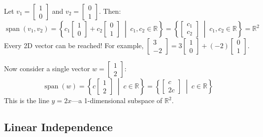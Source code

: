 \documentclass[11pt]{article}
\theoremstyle{definition}
\theoremstyle{plain}
\theoremstyle{remark}
\DeclareMathOperator{\spn}{span}
\begin{document}
\begin{workedexample}[title=\textbf{Worked Example: Computing a span}]
Let $v_1 = \begin{bmatrix}1\\0\end{bmatrix}$ and $v_2 = \begin{bmatrix}0\\1\end{bmatrix}$. Then:
\[
\spn(v_1, v_2) = \left\{c_1 \begin{bmatrix}1\\0\end{bmatrix} + c_2 \begin{bmatrix}0\\1\end{bmatrix} \;\middle|\; c_1, c_2 \in \mathbb{R}\right\} = \left\{\begin{bmatrix}c_1\\c_2\end{bmatrix} \;\middle|\; c_1, c_2 \in \mathbb{R}\right\} = \mathbb{R}^2
\]
Every 2D vector can be reached! For example, $\begin{bmatrix}3\\-2\end{bmatrix} = 3\begin{bmatrix}1\\0\end{bmatrix} + (-2)\begin{bmatrix}0\\1\end{bmatrix}$.

\medskip
Now consider a single vector $w = \begin{bmatrix}1\\2\end{bmatrix}$:
\[
\spn(w) = \left\{c\begin{bmatrix}1\\2\end{bmatrix} \;\middle|\; c \in \mathbb{R}\right\} = \left\{\begin{bmatrix}c\\2c\end{bmatrix} \;\middle|\; c \in \mathbb{R}\right\}
\]
This is the line $y = 2x$---a 1-dimensional subspace of $\mathbb{R}^2$.
\end{workedexample}

\subsection{Linear Independence}
\end{document}
